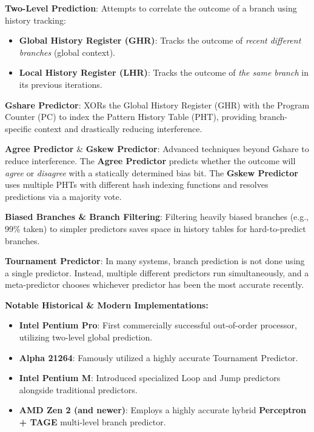 \begin{definition}
    \textbf{Two-Level Prediction}: Attempts to correlate the outcome of a branch using history tracking:
    \begin{itemize}
        \item \textbf{Global History Register (GHR)}: Tracks the outcome of \textit{recent different branches} (global context).
        \item \textbf{Local History Register (LHR)}: Tracks the outcome of \textit{the same branch} in its previous iterations.
    \end{itemize}
\end{definition}

\begin{definition}
    \textbf{Gshare Predictor}: XORs the Global History Register (GHR) with the Program Counter (PC) to index the Pattern History Table (PHT), providing branch-specific context and drastically reducing interference.
\end{definition}

\begin{definition}
    \textbf{Agree Predictor} \& \textbf{Gskew Predictor}: Advanced techniques beyond Gshare to reduce interference. The \textbf{Agree Predictor} predicts whether the outcome will \textit{agree} or \textit{disagree} with a statically determined bias bit. The \textbf{Gskew Predictor} uses multiple PHTs with different hash indexing functions and resolves predictions via a majority vote.
\end{definition}

\begin{important}
    \textbf{Biased Branches \& Branch Filtering}: Filtering heavily biased branches (e.g., 99\% taken) to simpler predictors saves space in history tables for hard-to-predict branches.
\end{important}

\begin{important}
    \textbf{Tournament Predictor}: In many systems, branch prediction is not done using a single predictor. Instead, multiple different predictors run simultaneously, and a meta-predictor chooses whichever predictor has been the most accurate recently. 
\end{important}

\begin{remark}
    \textbf{Notable Historical \& Modern Implementations:}
    \begin{itemize}
        \item \textbf{Intel Pentium Pro}: First commercially successful out-of-order processor, utilizing two-level global prediction.
        \item \textbf{Alpha 21264}: Famously utilized a highly accurate Tournament Predictor.
        \item \textbf{Intel Pentium M}: Introduced specialized Loop and Jump predictors alongside traditional predictors.
        \item \textbf{AMD Zen 2 (and newer)}: Employs a highly accurate hybrid \textbf{Perceptron + TAGE} multi-level branch predictor.
    \end{itemize}
\end{remark}

